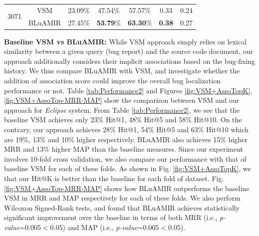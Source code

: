 \documentclass[sigconf,review,anonymous]{acmart}
\begin{document}
\begin{table}[!tb]
{\begin{tabular}{c|c|c|c|c|c|c}
			\multirow{2}{*}{3071}                                                                               & VSM & 23.09\% & 47.54\% & 57.57\% & 0.33 & 0.24 \\  \cline{2-7}   & BLuAMIR     & 27.45\%                                                 & \textbf{53.79}\%                                                 & \textbf{63.30}\%                                                  &   \textbf{0.38}  &  0.27    \\ 
			\hline
		\end{tabular}
		
	}
	\centering
\end{table}

\textbf{Baseline VSM vs BLuAMIR:} While VSM approach simply relies on lexical similarity between a given query (bug report) and the source code document, our approach additionally considers their implicit associations based on the bug-fixing history.
We thus compare BLuAMIR with VSM, and investigate whether the addition of association score could improve the overall bug localization performance or not. Table \ref{tab:Performance2} and Figures \ref{fig:VSM+AssoTopK}, \ref{fig:VSM+AssoTop-MRR-MAP} show the comparison between VSM and our approach for \emph{Eclipse} system. From Table \ref{tab:Performance2}, we see that the baseline VSM achieves only 23\% Hit@1, 48\% Hit@5 and 58\% Hit@10. On the contrary, our approach achieves 28\% Hit@1, 54\% Hit@5 and 63\% Hit@10 which are 19\%, 13\% and 10\% higher respectively. BLuAMIR also achieves 15\% higher MRR and 13\% higher MAP than the baseline measures. Since our experiment involves 10-fold cross validation, we also compare our performance with that of baseline VSM for each of these folds. As shown in Fig. \ref{fig:VSM+AssoTopK}, we that our Hit@K is better than the baseline for each fold of dataset. Fig. \ref{fig:VSM+AssoTop-MRR-MAP} shows how BLuAMIR outperforms the baseline VSM in MRR and MAP respectively for each of these folds. We also perform Wilcoxon Signed-Rank tests, and found that BLuAMIR achieves statistically significant improvement over the baseline in terms of both MRR (i.e., \emph{p-value}=0.005$<$0.05) and MAP (i.e., \emph{p-value}=0.005$<$0.05).
\end{document}
